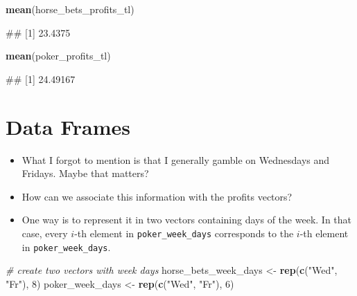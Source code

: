 \documentclass[
]{book}
\newenvironment{Shaded}{\begin{snugshade}}{\end{snugshade}}
\newcommand{\CommentTok}[1]{\textcolor[rgb]{0.56,0.35,0.01}{\textit{#1}}}
\newcommand{\DecValTok}[1]{\textcolor[rgb]{0.00,0.00,0.81}{#1}}
\newcommand{\FunctionTok}[1]{\textcolor[rgb]{0.13,0.29,0.53}{\textbf{#1}}}
\newcommand{\NormalTok}[1]{#1}
\newcommand{\OtherTok}[1]{\textcolor[rgb]{0.56,0.35,0.01}{#1}}
\newcommand{\StringTok}[1]{\textcolor[rgb]{0.31,0.60,0.02}{#1}}
\providecommand{\tightlist}{%
  \setlength{\itemsep}{0pt}\setlength{\parskip}{0pt}}
\begin{document}
\begin{Shaded}
\begin{Highlighting}[]
\FunctionTok{mean}\NormalTok{(horse\_bets\_profits\_tl)}
\end{Highlighting}
\end{Shaded}

\begin{Shaded}
\begin{Highlighting}[]
\NormalTok{\#\# [1] 23.4375}
\end{Highlighting}
\end{Shaded}

\begin{Shaded}
\begin{Highlighting}[]
\FunctionTok{mean}\NormalTok{(poker\_profits\_tl)}
\end{Highlighting}
\end{Shaded}

\begin{Shaded}
\begin{Highlighting}[]
\NormalTok{\#\# [1] 24.49167}
\end{Highlighting}
\end{Shaded}

\section{Data Frames}\label{data-frames}

\begin{itemize}
\tightlist
\item
  What I forgot to mention is that I generally gamble on Wednesdays and Fridays. Maybe that matters?
\item
  How can we associate this information with the profits vectors?
\end{itemize}

\begin{itemize}
\tightlist
\item
  One way is to represent it in two vectors containing days of the week. In that case, every \(i\)-th element in \texttt{poker\_week\_days} corresponds to the \(i\)-th element in \texttt{poker\_week\_days}.
\end{itemize}

\begin{Shaded}
\begin{Highlighting}[]
\CommentTok{\# create two vectors with week days}
\NormalTok{horse\_bets\_week\_days }\OtherTok{\textless{}{-}} \FunctionTok{rep}\NormalTok{(}\FunctionTok{c}\NormalTok{(}\StringTok{"Wed"}\NormalTok{, }\StringTok{"Fr"}\NormalTok{), }\DecValTok{8}\NormalTok{)}
\NormalTok{poker\_week\_days }\OtherTok{\textless{}{-}} \FunctionTok{rep}\NormalTok{(}\FunctionTok{c}\NormalTok{(}\StringTok{"Wed"}\NormalTok{, }\StringTok{"Fr"}\NormalTok{), }\DecValTok{6}\NormalTok{)}
\end{Highlighting}
\end{Shaded}
\end{document}
